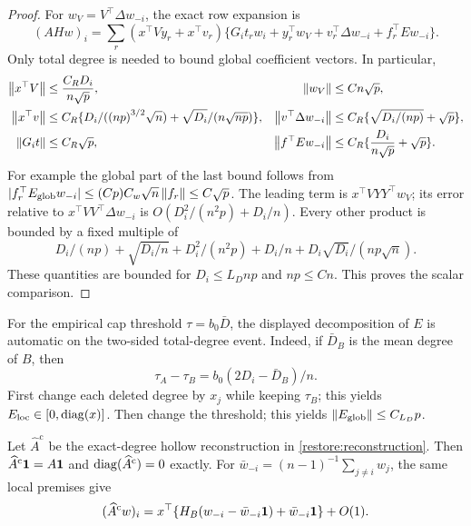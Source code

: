 \begin{proof}
For $w_V=V^\top\Delta w_{-i}$, the exact row expansion is
\[
 (AHw)_i=
 \sum_r(x^\top Vy_r+x^\top v_r)
 \{G_i t_rw_i+y_r^\top w_V+v_r^\top\Delta w_{-i}
                                      +f_r^\top Ew_{-i}\}.
\]
Only total degree is needed to bound global coefficient vectors. In
particular,
\begin{align*}
 \left\lVert x^\top V\right\rVert&\le \frac{C_RD_i}{n\sqrt p},&
 \left\lVert w_V\right\rVert&\le Cn\sqrt p,\\
 \left\lVert x^\top v\right\rVert&\le C_R\{D_i/({(np)}^{3/2}\sqrt n)+\sqrt{D_i}/(n\sqrt {np})\},&
 \left\lVert v^\top\Delta w_{-i}\right\rVert&\le C_R\{\sqrt{D_i/(np)}+\sqrt{p}\},\\
 \left\lVert G_i t\right\rVert&\le C_R\sqrt{p},&
 \left\lVert f^\top Ew_{-i}\right\rVert&\le C_R\{\frac{D_i}{n\sqrt p}+\sqrt{p}\}.
\end{align*}
For example the global part of the last bound follows from
$|f_r^\top E_\mathrm{glob}w_{-i}|
\le (Cp)C_w\sqrt n\left\lVert f_r\right\rVert\le C\sqrt{p}$.
The leading term is $x^\top VYY^\top w_V$; its error relative to
$x^\top VV^\top\Delta w_{-i}$ is
$O(D_i^2/({n^2p})+D_i/n)$. Every other product is bounded by a fixed
multiple of
\[
 D_i/(np)+\sqrt{D_i/n}+D_i^2/({n^2p})+D_i/n+D_i\sqrt{D_i}/({np}\sqrt n).
\]
These quantities are bounded for $D_i\le L_D{np}$ and ${np}\le Cn$.
This proves the scalar comparison.
\end{proof}

For the empirical cap threshold $\tau=b_0\bar D$, the displayed decomposition of
$E$ is automatic on the two-sided total-degree event. Indeed, if
$\bar D_B$ is the mean degree of $B$, then
\[
 \tau_A-\tau_B=b_0(2D_i-\bar D_B)/n.
\]
First change each deleted degree by $x_j$ while keeping $\tau_B$;
this yields $E_\mathrm{loc}\in[0,\operatorname{diag}(x)]$. Then change the threshold;
this yields $\left\lVert E_\mathrm{glob}\right\rVert\le C_{L_D}p$.

\begin{corollary}
\label{restore:loo-corrected}
Let $\widehat A^{\mathrm{c}}$ be the exact-degree hollow reconstruction in
\eqref{restore:reconstruction}. Then $\widehat A^{\mathrm{c}}\mathbf 1=A\mathbf 1$ and
$\operatorname{diag}(\widehat A^{\mathrm{c}})=0$ exactly.
For $\bar w_{-i}=(n-1)^{-1}\sum_{j\ne i}w_j$, the same local premises
give
\begin{equation}\label{restore:loo-corrected-action}
 (\widehat A^{\mathrm{c}} w)_i
 =x^\top\{H_B(w_{-i}-\bar w_{-i}\mathbf 1)+\bar w_{-i}\mathbf 1\}
       +O(1).
\end{equation}
\end{corollary}

